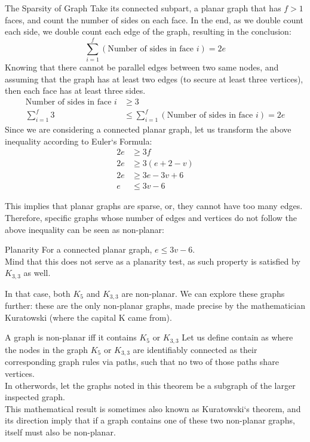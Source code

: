 \begin{ln-theorem}{The Sparsity of Graph}{}
    Take its connected subpart, a planar graph that has $f > 1$ faces, and count the number of sides on each face. In the end, as we double count each side, we double count each edge of the graph, resulting in the conclusion:
    \[\sum_{i = 1}^f (\text{Number of sides in face $i$}) = 2e\]
    Knowing that there cannot be parallel edges between two same nodes, and assuming that the graph has at least two edges (to secure at least three vertices), then each face has at least three sides. \\
    \begin{align*}
        \text{Number of sides in face $i$} &\geq 3 \\
        \sum_{i = 1}^f 3 &\leq \sum_{i = 1}^f (\text{Number of sides in face $i$}) = 2e
    \end{align*}
    Since we are considering a connected planar graph, let us transform the above inequality according to Euler`s Formula:
    \begin{align*}
        2e &\geq 3f \\
        2e &\geq 3(e + 2 - v) \\
        2e &\geq 3e - 3v + 6 \\
        e &\leq 3v - 6
    \end{align*}
\end{ln-theorem}
This implies that planar graphs are sparse, or, they cannot have too many edges. \\
Therefore, specific graphs whose number of edges and vertices do not follow the above inequality can be seen as non-planar:
\begin{ln-define}{Planarity}{}
    For a connected planar graph, $e \leq 3v - 6$. \\
    Mind that this does not serve as a planarity test, as such property is satisfied by $K_{3, 3}$ as well.
\end{ln-define}
In that case, both $K_5$ and $K_{3,3}$ are non-planar. We can explore these graphs further: these are the only non-planar graphs, made precise by the mathematician Kuratowski (where the capital K came from).
\begin{ln-theorem}{A graph is non-planar iff it contains $K_5$ or $K_{3,3}$}{}
    Let us define contain as where the nodes in the graph $K_5$ or $K_{3,3}$ are identifiably connected as their corresponding graph rules via paths, such that no two of those paths share vertices. \\
    In otherwords, let the graphs noted in this theorem be a subgraph of the larger inspected graph. \\
    This mathematical result is sometimes also known as Kuratowski`s theorem, and its direction imply that if a graph contains one of these two non-planar graphs, itself must also be non-planar.
\end{ln-theorem}

